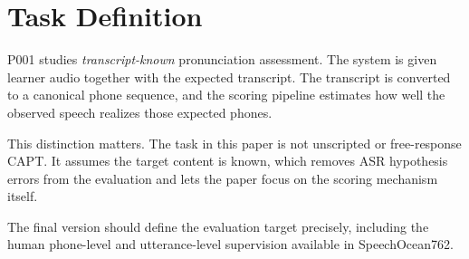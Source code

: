 \section{Task Definition}

P001 studies \emph{transcript-known} pronunciation assessment. The system is
given learner audio together with the expected transcript. The transcript is
converted to a canonical phone sequence, and the scoring pipeline estimates how
well the observed speech realizes those expected phones.

This distinction matters. The task in this paper is not unscripted or
free-response CAPT. It assumes the target content is known, which removes ASR
hypothesis errors from the evaluation and lets the paper focus on the scoring
mechanism itself.

The final version should define the evaluation target precisely, including the
human phone-level and utterance-level supervision available in SpeechOcean762.
